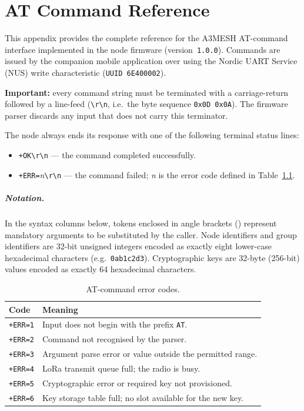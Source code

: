 \documentclass[english,bachelor]{tfgitic}[2026/01/22]
\begin{document}
\chapter{AT Command Reference}
\label{ch:appendix_at}

This appendix provides the complete reference for the A3MESH AT-command interface
implemented in the node firmware (version~\texttt{1.0.0}). Commands are issued by the
companion mobile application over  using the Nordic UART Service
(NUS) write characteristic (\texttt{UUID 6E400002}).

\bigskip
\noindent\textbf{Important:} every command string must be terminated with a
carriage-return followed by a line-feed
(\texttt{\textbackslash{}r\textbackslash{}n}, i.e.\ the byte sequence
\texttt{0x0D\,0x0A}). The firmware parser discards any input that does not carry
this terminator.

\medskip
\noindent The node always ends its response with one of the following terminal status
lines:
\begin{itemize}
    \item \texttt{+OK\textbackslash{}r\textbackslash{}n} --- the command completed successfully.
    \item \texttt{+ERR=}\textit{n}\texttt{\textbackslash{}r\textbackslash{}n} --- the command failed; \textit{n} is the error code defined in Table~\ref{tab:at_appendix_errors}.
\end{itemize}

\paragraph{Notation.}
In the syntax columns below, tokens enclosed in angle brackets ()
represent mandatory arguments to be substituted by the caller. Node identifiers and
group identifiers are 32-bit unsigned integers encoded as exactly eight lower-case
hexadecimal characters (e.g.\ \texttt{0ab1c2d3}). Cryptographic keys are 32-byte
(256-bit) values encoded as exactly 64 hexadecimal characters.

\begin{table}[htbp]
    \centering
    \caption{AT-command error codes.}
    \label{tab:at_appendix_errors}
    \begin{tabular}{ll}
        \toprule
        \textbf{Code} & \textbf{Meaning} \\
        \midrule
        \texttt{+ERR=1} & Input does not begin with the prefix \texttt{AT}. \\
        \texttt{+ERR=2} & Command not recognised by the parser. \\
        \texttt{+ERR=3} & Argument parse error or value outside the permitted range. \\
        \texttt{+ERR=4} & LoRa transmit queue full; the radio is busy. \\
        \texttt{+ERR=5} & Cryptographic error or required key not provisioned. \\
        \texttt{+ERR=6} & Key storage table full; no slot available for the new key. \\
        \bottomrule
    \end{tabular}
\end{table}
\end{document}
